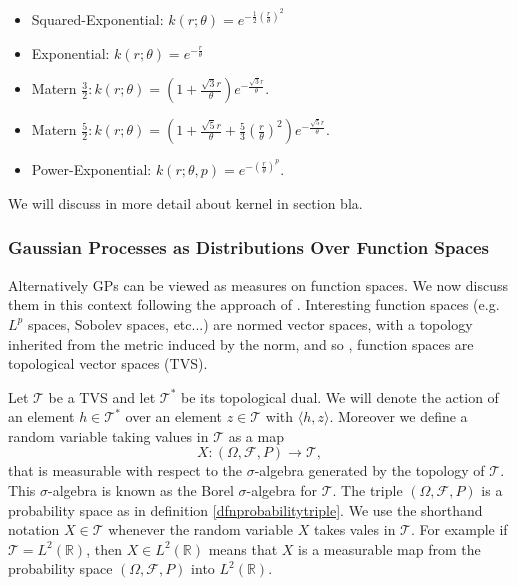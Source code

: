 \documentclass[12pt]{book}
\newcommand{\tvs}{\mathscr{T}} %
\begin{document}
\begin{itemize}
\item Squared-Exponential: $k(r;\theta)=e^{-\frac{1}{2}(\frac{r}{\theta})^{2}}$
\item Exponential: $k(r;\theta)=e^{-\frac{r}{\theta}}$\\
\item Matern $\frac{3}{2}: k(r;\theta)=(1+\frac{\sqrt{3}r}{\theta})e^{-\frac{\sqrt{3}r}{\theta}}$.
\item Matern $\frac{5}{2}: k(r;\theta)=(1+\frac{\sqrt{5}r}{\theta}+\frac{5}{3}
(\frac{r}{\theta})^{2})e^{-\frac{\sqrt{5}r}{\theta}}$.
\item Power-Exponential: $k(r;\theta,p)=e^{-(\frac{r}{\theta})^{p}}$.
\end{itemize}
We will discuss in more detail about kernel in section bla.





\subsubsection{Gaussian Processes as Distributions Over Function Spaces}

Alternatively GPs can be viewed as  measures on function spaces. We now discuss them in this
context following the approach of \cite{lifshits2012lectures}.
\newline
Interesting function spaces (e.g. $L^{p}$ spaces, Sobolev spaces, etc...) are 
normed vector spaces, with a topology inherited from the metric induced by the norm, and so 
, function spaces are topological vector spaces (TVS). 

Let $\mathscr{T}$ be a TVS and  let $\mathscr{T}^{*}$ be its topological dual. 
We will denote the action of an 
element $h\in\tvs^{*}$ over an element $z\in\tvs$ with $\langle h,z\rangle$. Moreover 
we  define a random variable taking values in $\tvs$ as a map 
\begin{equation*}
X:(\Omega,\mathscr{F},P)\longrightarrow\tvs,
\end{equation*}
that is measurable with respect to the $\sigma$-algebra generated by the topology
of $\tvs$. This $\sigma$-algebra is known as the Borel $\sigma$-algebra for $\tvs$.
The triple $(\Omega,\mathscr{F},P)$ is a probability space as in definition \ref{dfnprobabilitytriple}. 
We use the shorthand notation  $X\in\tvs$ whenever the random variable $X$ takes vales in $\tvs$. 
For example if $\tvs=L^{2}(\mathbb{R})$,  then  $X\in L^{2}(\mathbb{R})$ means that $X$ is a measurable
map from the probability space $(\Omega,\mathscr{F},P)$ into $L^{2}(\mathbb{R})$.
\end{document}
